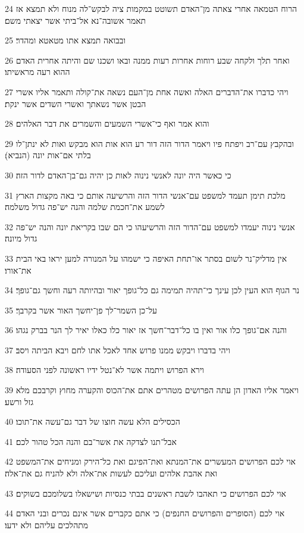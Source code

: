 \par 24 הרוח הטמאה אחרי צאתה מן־האדם תשוטט במקמות ציה לבקש־לה מנוח ולא תמצא אז תאמר אשובה־נא אל־ביתי אשר יצאתי משם׃
\par 25 ובבואה תמצא אתו מטאטא ומהדר׃
\par 26 ואחר תלך ולקחה שבע רוחות אחרות רעות ממנה ובאו ושכנו שם והיתה אחרית האדם ההוא רעה מראשיתו׃
\par 27 ויהי כדברו את־הדברים האלה ואשה אחת מן־העם נשאה את־קולה ותאמר אליו אשרי הבטן אשר נשאתך ואשרי השדים אשר ינקת׃
\par 28 והוא אמר ואף כי־אשרי השמעים והשמרים את דבר האלהים׃
\par 29 ובהקבץ עם־רב ויפתח פיו ויאמר הדור הזה דור רע הוא אות הוא מבקש ואות לא ינתן־לו בלתי אם־אות יונה (הנביא)׃
\par 30 כי כאשר היה יונה לאנשי נינוה לאות כן יהיה גם־בן־האדם לדור הזה׃
\par 31 מלכת תימן תעמד למשפט עם־אנשי הדור הזה והרשיעה אותם כי באה מקצות הארץ לשמע את־חכמת שלמה והנה יש־פה גדול משלמה׃
\par 32 אנשי נינוה יעמדו למשפט עם־הדור הזה והרשיעהו כי הם שבו בקריאת יונה והנה יש־פה גדול מיונה׃
\par 33 אין מדליק־נר לשום בסתר או־תחת האיפה כי ישמהו על המנורה למען יראו באי הבית את־אורו׃
\par 34 נר הגוף הוא העין לכן עינך כי־תהיה תמימה גם כל־גופך יאור ובהיותה רעה וחשך גם־גופך׃
\par 35 על־כן השמר־לך פן־יחשך האור אשר בקרבך׃
\par 36 והנה אם־גופך כלו אור ואין בו כל־דבר־חשך אז יאור כלו כאלו יאיר לך הנר בברק נגהו׃
\par 37 ויהי בדברו ויבקש ממנו פרוש אחד לאכל אתו לחם ויבא הביתה ויסב׃
\par 38 וירא הפרוש ויתמה אשר לא־נטל ידיו ראשונה לפני הסעודה׃
\par 39 ויאמר אליו האדון הן עתה הפרושים מטהרים אתם את־הכוס והקערה מחוץ וקרבכם מלא גזל ורשע׃
\par 40 הכסילים הלא עשה חוצו של דבר גם־עשה את־תוכו׃
\par 41 אבל־תנו לצדקה את אשר־בם והנה הכל טהור לכם׃
\par 42 אוי לכם הפרושים המעשרים את־המנתא ואת־הפיגם ואת כל־הירק ומניחים את־המשפט ואת אהבת אלהים ועליכם לעשות את־אלה ולא להניח גם את־אלה׃
\par 43 אוי לכם הפרושים כי תאהבו לשבת ראשנים בבתי כנסיות ושישאלו בשלומכם בשוקים׃
\par 44 אוי לכם (הסופרים והפרושים החנפים) כי אתם כקברים אשר אינם נכרים ובני האדם מתהלכים עליהם ולא ידעו׃

